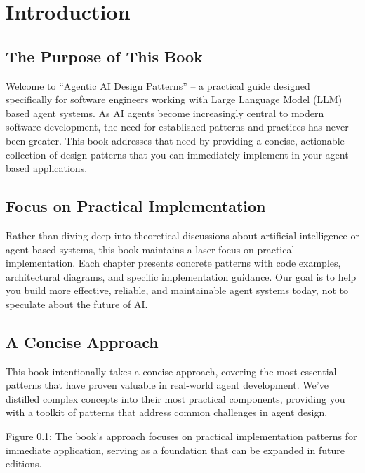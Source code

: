 \documentclass[11pt,oneside]{book}
\begin{document}
\tableofcontents
\clearpage

\chapter{Introduction}\label{introduction}

\section{The Purpose of This Book}\label{the-purpose-of-this-book}

Welcome to ``Agentic AI Design Patterns'' -- a practical guide designed
specifically for software engineers working with Large Language Model
(LLM) based agent systems. As AI agents become increasingly central to
modern software development, the need for established patterns and
practices has never been greater. This book addresses that need by
providing a concise, actionable collection of design patterns that you
can immediately implement in your agent-based applications.

\section{Focus on Practical
Implementation}\label{focus-on-practical-implementation}

Rather than diving deep into theoretical discussions about artificial
intelligence or agent-based systems, this book maintains a laser focus
on practical implementation. Each chapter presents concrete patterns
with code examples, architectural diagrams, and specific implementation
guidance. Our goal is to help you build more effective, reliable, and
maintainable agent systems today, not to speculate about the future of
AI.

\section{A Concise Approach}\label{a-concise-approach}

This book intentionally takes a concise approach, covering the most
essential patterns that have proven valuable in real-world agent
development. We've distilled complex concepts into their most practical
components, providing you with a toolkit of patterns that address common
challenges in agent design.

Figure 0.1: The book's approach focuses on practical implementation
patterns for immediate application, serving as a foundation that can be
expanded in future editions.
\end{document}
